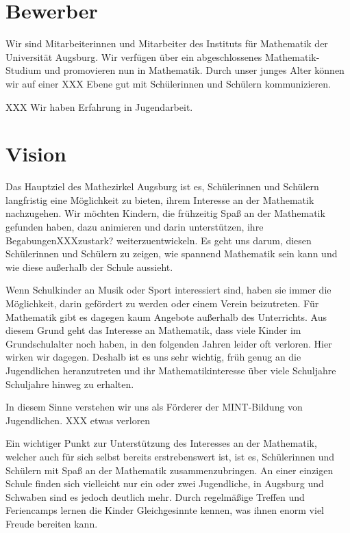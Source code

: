 \documentclass[12pt]{zettel}
\begin{document}
\section{Bewerber}

Wir sind Mitarbeiterinnen und Mitarbeiter des Instituts für Mathematik der
Universität Augsburg. Wir verfügen über ein abgeschlossenes Mathematik-Studium
und promovieren nun in Mathematik. Durch unser junges Alter können wir auf
einer XXX Ebene gut mit Schülerinnen und Schülern kommunizieren.

XXX Wir haben Erfahrung in Jugendarbeit.


\section{Vision}

Das Hauptziel des Mathezirkel Augsburg ist es, Schülerinnen und Schülern
langfristig eine Möglichkeit zu bieten, ihrem Interesse an der
Mathematik nachzugehen. Wir möchten Kindern, die frühzeitig Spaß an der
Mathematik gefunden haben, dazu animieren und darin unterstützen, ihre
BegabungenXXXzustark? weiterzuentwickeln.
Es geht uns darum, diesen Schülerinnen und
Schülern zu zeigen, wie spannend Mathematik sein kann und wie diese außerhalb der Schule aussieht. 

Wenn Schulkinder an Musik oder Sport interessiert sind, haben sie immer die
Möglichkeit, darin gefördert zu werden oder einem Verein beizutreten. Für
Mathematik gibt es dagegen kaum Angebote außerhalb des Unterrichts. Aus diesem
Grund geht das Interesse an Mathematik, dass viele Kinder im Grundschulalter
noch haben, in den folgenden Jahren leider oft verloren. Hier wirken wir
dagegen. Deshalb ist es uns sehr wichtig, früh genug an die Jugendlichen
heranzutreten und ihr Mathematikinteresse über viele Schuljahre
Schuljahre hinweg zu erhalten.

In diesem Sinne verstehen wir uns als Förderer der MINT-Bildung von
Jugendlichen. XXX etwas verloren

Ein wichtiger Punkt zur Unterstützung des Interesses an der
Mathematik, welcher auch für sich selbst bereits erstrebenswert ist, ist es,
Schülerinnen und Schülern mit Spaß an der Mathematik zusammenzubringen.
An einer einzigen Schule finden sich vielleicht
nur ein oder zwei Jugendliche, in Augsburg und Schwaben sind es jedoch
deutlich mehr. Durch regelmäßige Treffen und Feriencamps lernen die
Kinder Gleichgesinnte kennen, was ihnen enorm viel Freude bereiten kann.
\end{document}
